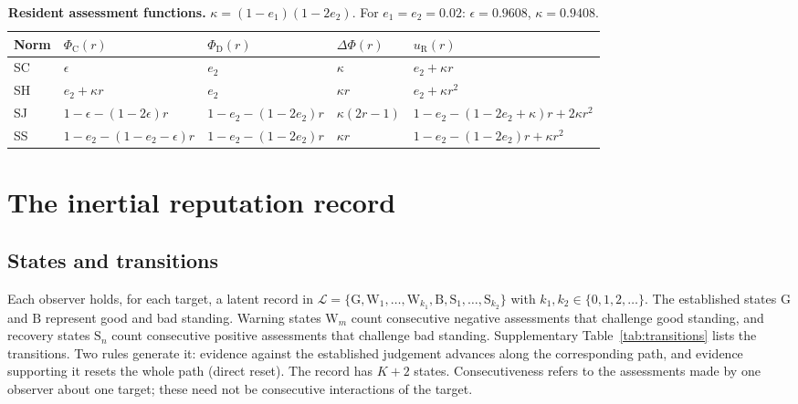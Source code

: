 \documentclass[fleqn,10pt]{article}
\theoremstyle{plain}
\theoremstyle{remark}
\newcommand{\G}{\mathrm G}
\newcommand{\B}{\mathrm B}
\newcommand{\W}{\mathrm W}
\renewcommand{\S}{\mathrm S}
\newcommand{\C}{\mathrm C}
\newcommand{\D}{\mathrm D}
\begin{document}
\begin{table}[htbp]
\centering\small
\caption{\textbf{Resident assessment functions.} $\kappa=(1-e_1)(1-2e_2)$. For $e_1=e_2=0.02$: $\epsilon=0.9608$, $\kappa=0.9408$.}
\label{tab:resident-functions}
\begin{tabular}{@{}lllll@{}}
\toprule
Norm & $\Phi_\C(r)$ & $\Phi_\D(r)$ & $\Delta\Phi(r)$ & $u_{\mathrm R}(r)$\\
\midrule
SC & $\epsilon$ & $e_2$ & $\kappa$ & $e_2+\kappa r$\\
SH & $e_2+\kappa r$ & $e_2$ & $\kappa r$ & $e_2+\kappa r^2$\\
SJ & $1-\epsilon-(1-2\epsilon)r$ & $1-e_2-(1-2e_2)r$ & $\kappa(2r-1)$ & $1-e_2-(1-2e_2+\kappa)r+2\kappa r^2$\\
SS & $1-e_2-(1-e_2-\epsilon)r$ & $1-e_2-(1-2e_2)r$ & $\kappa r$ & $1-e_2-(1-2e_2)r+\kappa r^2$\\
\bottomrule
\end{tabular}
\end{table}

\section{The inertial reputation record}
\label{sec:record}

\subsection{States and transitions}
Each observer holds, for each target, a latent record in
$\mathcal L=\{\G,\W_1,\dots,\W_{k_1},\B,\S_1,\dots,\S_{k_2}\}$ with
$k_1,k_2\in\{0,1,2,\dots\}$. The established states $\G$ and $\B$ represent
good and bad standing. Warning states $\W_m$ count consecutive negative
assessments that challenge good standing, and recovery states $\S_n$ count
consecutive positive assessments that challenge bad standing. Supplementary
Table~\ref{tab:transitions} lists the transitions. Two rules generate it:
evidence against the established judgement advances along the corresponding
path, and evidence supporting it resets the whole path (direct reset). The
record has $K+2$ states. Consecutiveness refers to the assessments made by one
observer about one target; these need not be consecutive interactions of the
target.
\end{document}

